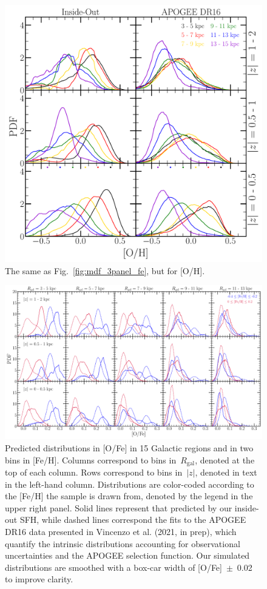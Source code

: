 \documentclass[fleqn, usenatbib]{mnras}
\begin{document}
\begin{figure} 
\centering 
\includegraphics[scale = 0.34]{mdf_3panel_o.pdf} 
\caption{The same as Fig.~\ref{fig:mdf_3panel_fe}, but for [O/H].} 
\label{fig:mdf_3panel_o} 
\end{figure} 

\begin{figure} 
\centering 
\includegraphics[scale = 0.32]{ofe_mdfs_insideout.pdf} 
\caption{Predicted distributions in [O/Fe] in 15 Galactic regions and in two 
bins in [Fe/H]. Columns correspond to bins in~$R_\text{gal}$, denoted at the 
top of each column. Rows correspond to bins in~$\left|z\right|$, denoted in 
text in the left-hand column. Distributions are color-coded according to the 
[Fe/H] the sample is drawn from, denoted by the legend in the upper right 
panel. Solid lines represent that predicted by our inside-out SFH, while 
dashed lines correspond the fits to the APOGEE DR16 data presented in Vincenzo 
et al. (2021, in prep), which quantify the intrinsic distributions accounting 
for observational uncertainties and the APOGEE selection function. Our 
simulated distributions are smoothed with a box-car width of [O/Fe]~$\pm$~0.02 
to improve clarity. }
\label{fig:ofe_mdfs_insideout} 
\end{figure} 
\end{document}
